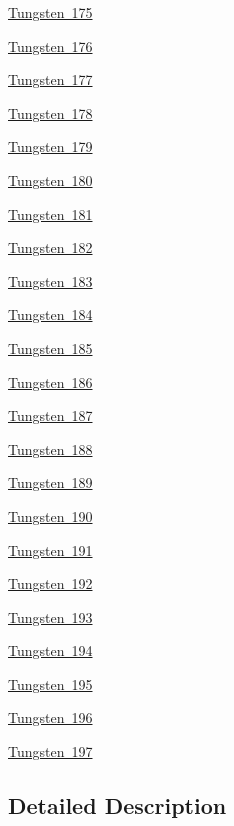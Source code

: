 \begin{DoxyCompactItemize}
\item 
\mbox{\hyperlink{group___isotope_const-_tungsten-_w175}{Tungsten 175}}
\item 
\mbox{\hyperlink{group___isotope_const-_tungsten-_w176}{Tungsten 176}}
\item 
\mbox{\hyperlink{group___isotope_const-_tungsten-_w177}{Tungsten 177}}
\item 
\mbox{\hyperlink{group___isotope_const-_tungsten-_w178}{Tungsten 178}}
\item 
\mbox{\hyperlink{group___isotope_const-_tungsten-_w179}{Tungsten 179}}
\item 
\mbox{\hyperlink{group___isotope_const-_tungsten-_w180}{Tungsten 180}}
\item 
\mbox{\hyperlink{group___isotope_const-_tungsten-_w181}{Tungsten 181}}
\item 
\mbox{\hyperlink{group___isotope_const-_tungsten-_w182}{Tungsten 182}}
\item 
\mbox{\hyperlink{group___isotope_const-_tungsten-_w183}{Tungsten 183}}
\item 
\mbox{\hyperlink{group___isotope_const-_tungsten-_w184}{Tungsten 184}}
\item 
\mbox{\hyperlink{group___isotope_const-_tungsten-_w185}{Tungsten 185}}
\item 
\mbox{\hyperlink{group___isotope_const-_tungsten-_w186}{Tungsten 186}}
\item 
\mbox{\hyperlink{group___isotope_const-_tungsten-_w187}{Tungsten 187}}
\item 
\mbox{\hyperlink{group___isotope_const-_tungsten-_w188}{Tungsten 188}}
\item 
\mbox{\hyperlink{group___isotope_const-_tungsten-_w189}{Tungsten 189}}
\item 
\mbox{\hyperlink{group___isotope_const-_tungsten-_w190}{Tungsten 190}}
\item 
\mbox{\hyperlink{group___isotope_const-_tungsten-_w191}{Tungsten 191}}
\item 
\mbox{\hyperlink{group___isotope_const-_tungsten-_w192}{Tungsten 192}}
\item 
\mbox{\hyperlink{group___isotope_const-_tungsten-_w193}{Tungsten 193}}
\item 
\mbox{\hyperlink{group___isotope_const-_tungsten-_w194}{Tungsten 194}}
\item 
\mbox{\hyperlink{group___isotope_const-_tungsten-_w195}{Tungsten 195}}
\item 
\mbox{\hyperlink{group___isotope_const-_tungsten-_w196}{Tungsten 196}}
\item 
\mbox{\hyperlink{group___isotope_const-_tungsten-_w197}{Tungsten 197}}
\end{DoxyCompactItemize}


\subsection{Detailed Description}
